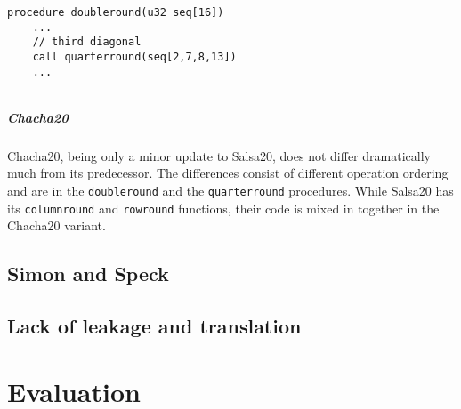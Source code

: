 \documentclass[a4paper,10pt,openright]{memoir}
\newcommand{\code}[1]{\texttt{#1}}
\begin{document}


\begin{lstlisting}[language=Janus]
procedure doubleround(u32 seq[16])
	...
	// third diagonal
	call quarterround(seq[2,7,8,13])
	...
\end{lstlisting}


\begin{lstlisting}[language=Janus]
\end{lstlisting}

\paragraph{Chacha20}

Chacha20, being only a minor update to Salsa20, does not differ 
dramatically much from its predecessor. The differences consist of 
different operation ordering and are in the \code{doubleround} and the 
\code{quarterround} procedures. While Salsa20 has its 
\code{columnround} and \code{rowround} functions, their code is mixed 
in together in the Chacha20 variant.




\section{Simon and Speck}


\section{Lack of leakage and translation}




\chapter{Evaluation}
\label{sec:eval}
\end{document}
